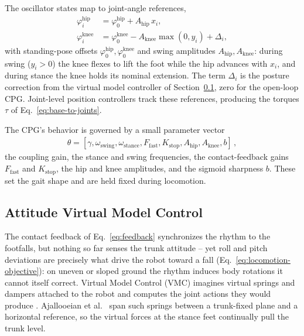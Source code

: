 \documentclass[letterpaper, 10 pt, conference]{ieeeconf}  %
\begin{document}
The oscillator states map to joint-angle references,
\begin{align}
  \varphi^{\text{hip}}_i &=  \varphi^{\text{hip}}_0  +  A_{\text{hip}}\, x_i , \\
  \varphi^{\text{knee}}_i &= \varphi^{\text{knee}}_0  -  A_{\text{knee}} \max( 0, y_i)  +  \Delta_i ,
  \label{eq:joint-map}
\end{align}
with standing-pose offsets $\varphi^{\text{hip}}_0, \varphi^{\text{knee}}_0$ and swing amplitudes $A_{\text{hip}}, A_{\text{knee}}$: during swing ($y_i > 0$) the knee flexes to lift the foot while the hip advances with $x_i$, and during stance the knee holds its nominal extension.
The term $\Delta_i$ is the posture correction from the virtual model controller of Section~\ref{sec:vmc}, zero for the open-loop CPG.
Joint-level position controllers track these references, producing the torques $\tau$ of Eq.~\ref{eq:base-to-joints}.

The CPG's behavior is governed by a small parameter vector
\begin{align}
    \theta = [\gamma, \omega_{\text{swing}}, \omega_{\text{stance}}, F_{\text{fast}}, K_{\text{stop}}, A_{\text{hip}}, A_{\text{knee}}, b] \,,
    \label{eq:cpg-parameters}
\end{align}
the coupling gain, the stance and swing frequencies, the contact-feedback gains $F_{\text{fast}}$ and $K_{\text{stop}}$, the hip and knee amplitudes, and the sigmoid sharpness $b$.
These set the gait shape and are held fixed during locomotion.


\subsection{Attitude Virtual Model Control}
\label{sec:vmc}

The contact feedback of Eq.~\ref{eq:feedback} synchronizes the rhythm to the footfalls, but nothing so far senses the trunk attitude -- yet roll and pitch deviations are precisely what drive the robot toward a fall (Eq.~\ref{eq:locomotion-objective}): on uneven or sloped ground the rhythm induces body rotations it cannot itself correct.
Virtual Model Control (VMC) imagines virtual springs and dampers attached to the robot and computes the joint actions they would produce \cite{pratt2001virtual}.
Ajallooeian et al.~\cite{ajallooeian2013central} span such springs between a trunk-fixed plane and a horizontal reference, so the virtual forces at the stance feet continually pull the trunk level.
\end{document}
